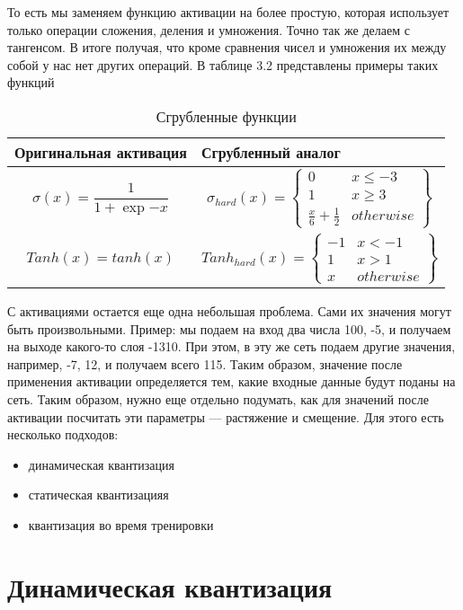 \documentclass[oneside,final,12pt]{extreport}
\begin{document}
То есть мы заменяем функцию активации на более простую, которая использует только операции сложения, деления и умножения. Точно так же делаем с тангенсом. В итоге получая, что кроме сравнения чисел и умножения их между собой у нас нет других операций. В таблице 3.2 представлены примеры таких функций
\begin{table}[H]
\caption{Сгрубленные функции}
\label{table_1}
\begin{tabularx}{\textwidth}{|X|X|} %
\hline
Оригинальная активация & Сгрубленный аналог \\ \hline
$$\sigma (x)=\frac{1}{1+\exp{-x}}$$ & $$\sigma_{hard}(x)=\begin{Bmatrix} 0 & x \leq -3\\ 1 & x \geq 3\\ \frac{x}{6}+\frac{1}{2} & otherwise \end{Bmatrix}$$ \\
$$Tanh(x)=tanh(x)$$ & $$Tanh_{hard}(x)=\begin{Bmatrix} -1 & x < -1\\ 1 & x > 1\\ x & otherwise \end{Bmatrix}$$ \\ \hline
\end{tabularx}
\end{table}

С активациями остается еще одна небольшая проблема. Сами их значения могут быть произвольными. Пример: мы подаем на вход два числа 100, -5, и получаем на выходе какого-то слоя -1310. При этом, в эту же сеть подаем другие значения, например, -7, 12, и получаем всего 115. Таким образом, значение после применения активации определяется тем, какие входные данные будут поданы на сеть. Таким образом, нужно еще отдельно подумать, как для значений после активации посчитать эти параметры — растяжение и смещение. Для этого есть несколько подходов:
\begin{itemize}
    \item динамическая квантизация
    \item статическая квантизацияя
    \item квантизация во время тренировки
\end{itemize}

\section{Динамическая квантизация}
\end{document}
